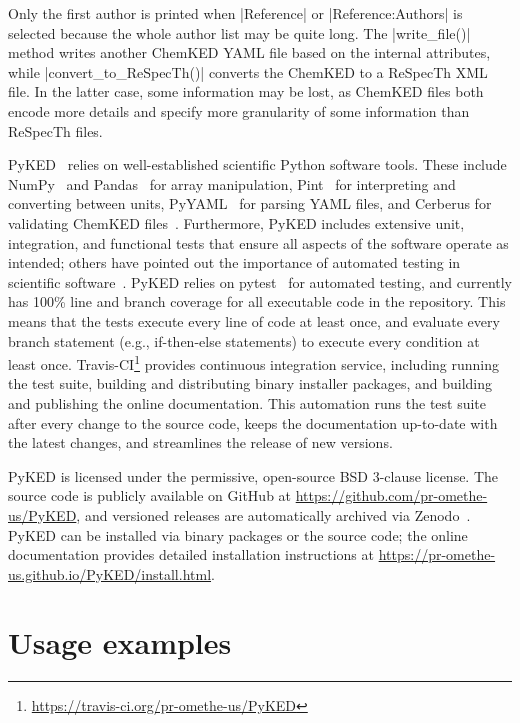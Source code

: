 \documentclass[12pt]{ijck}
\newcommand\ck{ChemKED}
\newcommand\pk{PyKED}
\begin{document}
Only the first author is printed when \pybox|Reference| or
\pybox|Reference:Authors| is selected because the whole author list may be
quite long. The \pybox|write_file()| method writes another \ck{} YAML file based on
the internal attributes, while \pybox|convert_to_ReSpecTh()| converts the \ck{}
to a ReSpecTh XML file. In the latter case, some information may be lost, as \ck{}
files both encode more details and specify more granularity of some information than
ReSpecTh files.

\pk{}~\autocite{PyKED} relies on well-established scientific Python software tools.
These include NumPy~\autocite{vanderWalt:2011np} and Pandas~\autocite{pandas,McKinney2010}
for array manipulation, Pint~\autocite{Grecco2016} for interpreting and converting
between units, PyYAML~\autocite{pyyaml} for parsing YAML
files, and Cerberus for validating \ck{} files~\autocite{cerberus}.
Furthermore, \pk{} includes extensive unit, integration, and functional tests
that ensure all aspects of the software operate as intended; others have pointed
out the importance of automated testing in scientific software~\autocite{Wilson:bestpractices}.
\pk{} relies on pytest~\autocite{pytest:3.0.1} for automated testing, and currently has
100\% line and branch coverage for all executable code in the repository. This
means that the tests execute every line of code at least once, and evaluate
every branch statement (e.g., if-then-else statements) to execute every condition
at least once.
Travis-CI\footnote{\url{https://travis-ci.org/pr-omethe-us/PyKED}} provides continuous
integration service, including running the test suite, building and distributing binary
installer packages, and building and publishing the online documentation. This automation
runs the test suite after every change to the source code, keeps the documentation
up-to-date with the latest changes, and streamlines the release of new versions.

\pk{} is licensed under the permissive, open-source BSD 3-clause license. The
source code is publicly available on GitHub at \url{https://github.com/pr-omethe-us/PyKED},
and versioned releases are automatically archived via Zenodo~\autocite{PyKED}.
\pk{} can be installed via binary packages or the source code; the online documentation
provides detailed installation instructions at
\url{https://pr-omethe-us.github.io/PyKED/install.html}.

\section{Usage examples}\label{sec:usage-example}
\end{document}
